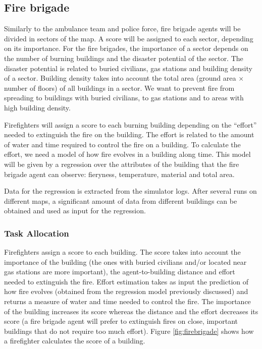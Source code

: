 \subsection{Fire brigade}
\label{sec:firefighters}
Similarly to the ambulance team and police force, fire brigade agents will be divided in sectors of the map. %
A score will be assigned to each sector, depending on its importance. For the fire brigades, the importance of a sector depends on the number of burning buildings and the disaster potential of the sector. The disaster potential is related to buried civilians, gas stations and building density of a sector. Building density takes into account the total area (ground area $\times$ number of floors) of all buildings in a sector. We want to prevent fire from spreading to buildings with buried civilians, to gas stations and to areas with high building density.

Firefighters will assign a score to each burning building depending on the ``effort'' needed to extinguish the fire on the building. The effort is related to the amount of water and time required to control the fire on a building. To calculate the effort, we need a model of how fire evolves in a building along time. This model will be given by a regression over the attributes of the building that the fire brigade agent can observe: fieryness, temperature, material and total area.

Data for the regression is extracted from the simulator logs. After several runs on different maps, a significant amount of data from different buildings can be obtained and used as input for the regression.

\subsubsection{Task Allocation}

Firefighters assign a score to each building. The score takes into account the importance of the building (the ones with buried civilians and/or located near gas stations are more important), the agent-to-building distance and effort needed to extinguish the fire. Effort estimation takes as input the prediction of how fire evolves (obtained from the regression model previously discussed) and returns a measure of water and time needed to control the fire. The importance of the building increases its score whereas the distance and the effort decreases its score (a fire brigade agent will prefer to extinguish fires on close, important buildings that do not require too much effort). Figure \ref{fig:firebrigade} shows how a firefighter calculates the score of a building.

